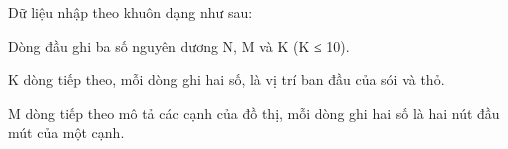 Dữ liệu nhập theo khuôn dạng như sau:

Dòng đầu ghi ba số nguyên dương N, M và K (K ≤ 10).

K dòng tiếp theo, mỗi dòng ghi hai số, là vị trí ban đầu của sói và thỏ.

M dòng tiếp theo mô tả các cạnh của đồ thị, mỗi dòng ghi hai số là hai nút đầu mút của một cạnh.